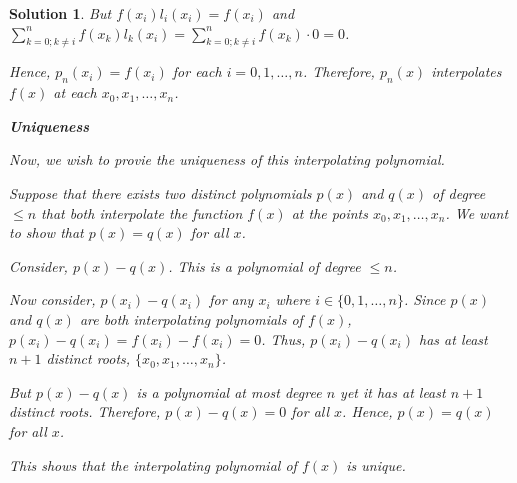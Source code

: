 \documentclass[12pt, letterpaper]{article}
\theoremstyle{nonumberplain}
\newtheorem{sol}{Solution}
\begin{document}
\begin{sol}
	But $f(x_i)l_i(x_i) = f(x_i)$ and $\sum_{k=0;k\neq i}^n f(x_k)l_k(x_i) = \sum_{k=0;k\neq i}^n f(x_k)\cdot 0 = 0$.

	Hence, $p_n(x_i) = f(x_i)$ for each $i = 0, 1, \ldots, n$. Therefore, $p_n(x)$ interpolates $f(x)$ at each $x_0, x_1, \ldots, x_n$.

	\medskip

	\textbf{Uniqueness}

	Now, we wish to provie the uniqueness of this interpolating polynomial.

	Suppose that there exists two distinct polynomials $p(x)$ and $q(x)$ of degree $\leq n$ that both interpolate the function $f(x)$ at the points $x_0, x_1, \ldots, x_n$. We want to show that $p(x) = q(x)$ for all $x$.

	Consider, $p(x) - q(x)$. This is a polynomial of degree $\leq n$.

	Now consider, $p(x_i) - q(x_i)$ for any $x_i$ where $i \in \{0, 1, \ldots, n\}$. Since $p(x)$ and $q(x)$ are both interpolating polynomials of $f(x)$, $p(x_i) - q(x_i) = f(x_i) - f(x_i) = 0$. Thus, $p(x_i) - q(x_i)$ has at least $n+1$ distinct roots, $\{x_0, x_1, \ldots, x_n\}$.

	But $p(x) - q(x)$ is a polynomial at most degree $n$ yet it has at least $n+1$ distinct roots. Therefore, $p(x) - q(x) = 0$ for all $x$. Hence, $p(x) = q(x)$ for all $x$.

	This shows that the interpolating polynomial of $f(x)$ is unique.

\end{sol}

\newpage
\end{document}
